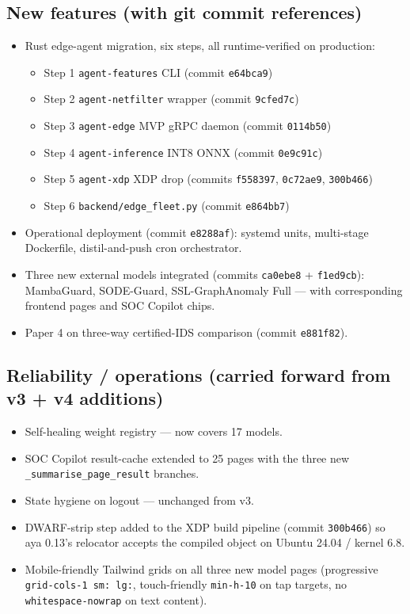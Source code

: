 \documentclass[11pt,a4paper]{article}
\begin{document}
\subsection*{New features (with git commit references)}
\begin{itemize}[nosep]
  \item Rust edge-agent migration, six steps, all runtime-verified
        on production:
    \begin{itemize}[nosep]
      \item Step 1 \texttt{agent-features} CLI (commit \texttt{e64bca9})
      \item Step 2 \texttt{agent-netfilter} wrapper (commit \texttt{9cfed7c})
      \item Step 3 \texttt{agent-edge} MVP gRPC daemon (commit \texttt{0114b50})
      \item Step 4 \texttt{agent-inference} INT8 ONNX (commit \texttt{0e9c91c})
      \item Step 5 \texttt{agent-xdp} XDP drop (commits \texttt{f558397}, \texttt{0c72ae9}, \texttt{300b466})
      \item Step 6 \texttt{backend/edge\_fleet.py} (commit \texttt{e864bb7})
    \end{itemize}
  \item Operational deployment (commit \texttt{e8288af}): systemd
        units, multi-stage Dockerfile, distil-and-push cron
        orchestrator.
  \item Three new external models integrated (commits \texttt{ca0ebe8}
        + \texttt{f1ed9cb}): MambaGuard, SODE-Guard, SSL-GraphAnomaly
        Full --- with corresponding frontend pages and SOC Copilot
        chips.
  \item Paper 4 on three-way certified-IDS comparison
        (commit \texttt{e881f82}).
\end{itemize}

\subsection*{Reliability / operations (carried forward from v3 +
              v4 additions)}
\begin{itemize}[nosep]
  \item Self-healing weight registry --- now covers 17 models.
  \item SOC Copilot result-cache extended to 25 pages with the three
        new \texttt{\_summarise\_page\_result} branches.
  \item State hygiene on logout --- unchanged from v3.
  \item DWARF-strip step added to the XDP build pipeline (commit
        \texttt{300b466}) so aya 0.13's relocator accepts the
        compiled object on Ubuntu 24.04 / kernel 6.8.
  \item Mobile-friendly Tailwind grids on all three new model pages
        (progressive \texttt{grid-cols-1 sm: lg:}, touch-friendly
        \texttt{min-h-10} on tap targets, no \texttt{whitespace-nowrap}
        on text content).
\end{itemize}
\end{document}
